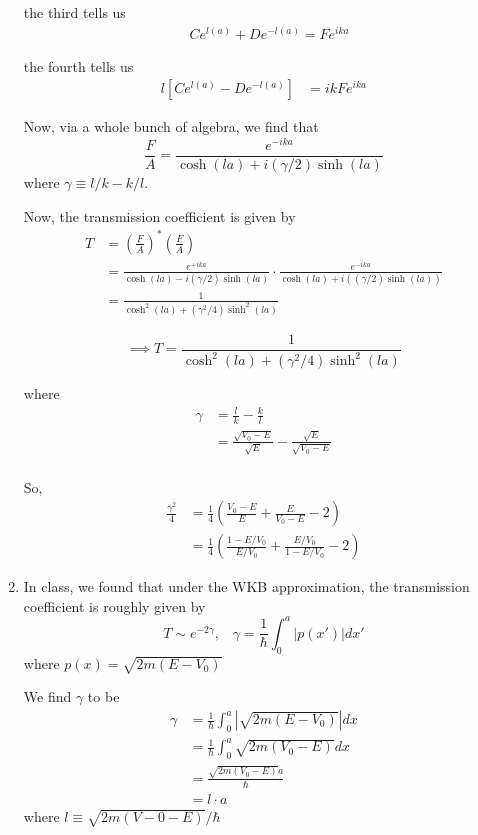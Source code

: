 \documentclass{article}
\begin{document}
\begin{enumerate}[label=(\alph*)]
  the third tells us 
  \begin{align*}
    & Ce^{l(a)} + De^{-l(a)} = Fe^{ika} 
  \end{align*}

  the fourth tells us 
  \begin{align*}
    l\left[  Ce^{l(a)} - De^{-l(a)}\right] &=  ik Fe^{ika} 
  \end{align*}

  Now, via a whole bunch of algebra, we find that 
  \[ \frac{F}{A} = \frac{e^{-ika}}{\cosh(la) + i(\gamma/2)\sinh(la)}  \]
  where $\gamma \equiv l/k - k/l$.

  Now, the transmission coefficient is given by 
  \begin{align*}
    T &= \left(\frac{F}{A}\right)^* \left(\frac{F}{A}\right) \\
    &= \frac{e^{+ika}}{\cosh(la) - i(\gamma/2)\sinh(la)} \cdot \frac{e^{-ika}}{\cosh(la) + i((\gamma/2)\sinh(la))} \\
    &= \frac{1}{\cosh^2(la) + (\gamma^2/4)\sinh^2(la)}
  \end{align*}

  \[\implies \boxed{T = \frac{1}{\cosh^2(la) + (\gamma^2/4)\sinh^2(la)} } \]

  where 
  \begin{align*}
    \gamma &= \frac{l}{k} - \frac{k}{l} \\
    &= \frac{\sqrt{V_0 - E}}{\sqrt{E}} - \frac{\sqrt{E}}{\sqrt{V_0 - E}} \\
  \end{align*}

  So, 
  \begin{align*}
    \frac{\gamma^2}{4} &= \frac{1}{4} \left( \frac{V_0 - E}{E} + \frac{E}{V_0 - E} - 2\right) \\
    &= \frac{1}{4} \left( \frac{1-E/V_0}{E/V_0} + \frac{E/V_0}{1 - E/V_0} - 2\right)
  \end{align*}

  \vskip 0.5cm
  \item In class, we found that under the WKB approximation, the transmission coefficient is roughly given by
  \[ T \sim e^{-2\gamma},\;\;\; \gamma = \frac{1}{\hbar}\int_{0}^{a} | p(x') | dx' \]
  where $p(x) = \sqrt{2m(E - V_0)}$

  We find $\gamma$ to be 
  \begin{align*}
    \gamma &= \frac{1}{\hbar}\int_{0}^{a} \left| \sqrt{2m(E - V_0)} \right| dx \\
    &= \frac{1}{\hbar}\int_{0}^{a}  \sqrt{2m(V_0 - E)}  dx \\
    &=\frac{\sqrt{2m(V_0 - E)}a}{\hbar} \\
    &= l \cdot a 
  \end{align*}
  where $l \equiv \sqrt{2m(V-0 - E)}/\hbar$


\end{enumerate}
\end{document}

